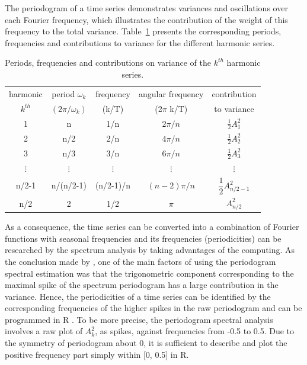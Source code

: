 \documentclass[12pt,msc]{uom_eee_dissertation_casson}
\newcommand{\tabref}[1]{Table~\ref{#1}}
\begin{document}
The periodogram of a time series demonstrates variances and oscillations over each Fourier frequency, which illustrates the contribution of the weight of this frequency to the total variance. \tabref{table:1} presents the corresponding periods, frequencies and contributions to variance for the different harmonic series.
\begin{table}
\centering
\begin{tabular}{| c | c  | c | c |c | }
		\hline
		harmonic & period $\omega_{k}$ & frequency & angular frequency & contribution \\
$k^{th}$&$(2\pi/\omega_{k})$&(k/T)&(2$\pi$ k/T)&to variance \\\hline
		1 & n   & 1/n & $2\pi/n$ & $\frac{1}{2}A^{2}_{1}$ \\ \hline
		2 & n/2 & 2/n & $4\pi/n$ & $\frac{1}{2}A^{2}_{2}$\\ \hline
		3 & n/3 & 3/n & $6\pi/n$ & $\frac{1}{2}A^{2}_{3}$\\ \hline
		$\vdots$ & $\vdots$ & $\vdots$ & $\vdots$& $\vdots$\\ \hline
		n/2-1 & n/(n/2-1) & (n/2-1)/n & $(n-2)\pi/n$ & $\dfrac{1}{2}A^{2}_{n/2-1}$ \\ \hline
		n/2 & 2 & 1/2 & $\pi$ & $A^{2}_{n/2}$\\ \hline
	\end{tabular}
\caption{Periods, frequencies and contributions on variance of the $k^{th}$ harmonic series.
     }
	\label{table:1}
\end{table}

As a consequence, the time series can be converted into a combination of Fourier functions with seasonal frequencies and its frequencies (periodicities) can be researched by the spectrum analysis by taking advantages of the computing. As the conclusion made by \citet{scargle1982studies}, one of the main factors of using the periodogram spectral estimation was that the trigonometric component corresponding to the maximal spike of the spectrum periodogram has a large contribution in the variance. Hence, the periodicities of a time series can be identified by the corresponding frequencies of the higher spikes in the raw periodogram and can be programmed in R \citep[see ][ chap.9]{cowpertwait2009introductory}. To be more precise, the periodogram spectral analysis involves a raw plot of $A^{2}_{k}$, as spikes, against frequencies from -0.5 to 0.5. Due to the symmetry of periodogram about 0, it is sufficient to describe and plot the positive frequency part simply within [0, 0.5] in R.
\end{document}
